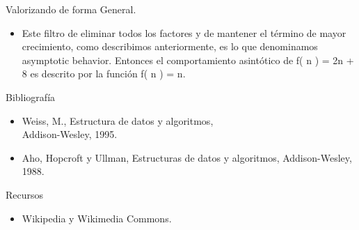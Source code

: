 \documentclass{beamer} %
\begin{document}
\begin{frame}{Valorizando de forma General.}
  \begin{itemize}
    \item Este filtro de eliminar todos los factores y de mantener el término de mayor crecimiento, como describimos anteriormente, es lo que denominamos asymptotic behavior. Entonces el comportamiento asintótico de f( n ) = 2n + 8 es descrito por la función f( n ) = n.
  \end{itemize}
\end{frame}

\begin{frame}
 \begin{block}{Bibliografía}
  \begin{itemize}
    \item Weiss, M., Estructura de datos y algoritmos,\\ Addison-Wesley, 1995.
    \item Aho, Hopcroft y Ullman, Estructuras de datos y algoritmos, Addison-Wesley, 1988.
  \end{itemize}
 \end{block}
 \begin{block}{Recursos}
  \begin{itemize}
    \item Wikipedia y Wikimedia Commons.
  \end{itemize}
 \end{block}
\end{frame}
\end{document}
